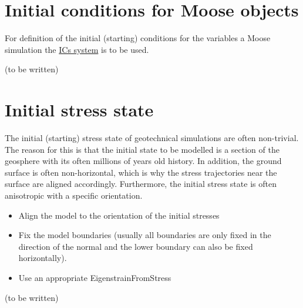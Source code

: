 \section{Initial conditions for Moose objects}
\label{chap:IC-moose-objects}

For definition of the initial (starting) conditions for the variables a Moose
simulation the \href{https://mooseframework.inl.gov/syntax/ICs}{ICs system} is
to be used.

(to be written)

\section{Initial stress state}
\label{chap:IC-stress-state}

The initial (starting) stress state of geotechnical simulations are often
non-trivial. The reason for this is that the initial state to be modelled is a
section of the geosphere with its often millions of years old history. In
addition, the ground surface is often non-horizontal, which is why the stress
trajectories near the surface are aligned accordingly. Furthermore, the initial
stress state is often anisotropic with a specific orientation.

\begin{itemize}
    \item Align the model to the orientation of the initial stresses
    \item Fix the model boundaries (usually all boundaries are only fixed in the
          direction of the normal and the lower boundary can also be fixed horizontally).
    \item Use an appropriate EigenstrainFromStress
\end{itemize}

(to be written)

